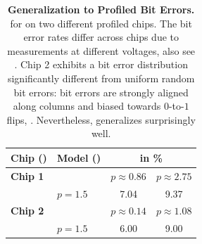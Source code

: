 \begin{table}[t]
	\centering
	\small
	\caption{\textbf{Generalization to Profiled Bit Errors.} \RTE for \Random on two different profiled chips. The bit error rates differ across chips due to measurements at different voltages, also see . Chip 2 exhibits a bit error distribution significantly different from uniform random bit errors: bit errors are strongly aligned along columns and biased towards $0$-to-$1$ flips, \cf {}. Nevertheless, \Random generalizes surprisingly well.}
	\label{tab:randbet-generalization}
	\vspace*{-0.25cm}
	\hspace*{-0.15cm}
	\begin{tabular}{| l | l | c | c |}
		\hline
		Chip (\figref{fig:errors}) & Model (\CifarT)& \multicolumn{2}{c|}{\RTE in \%}\\
		\hline
		\hline
		\bfseries Chip 1 && $p{\approx}0.86$ & {\color{colorbrewer1}$p{\approx}2.75$}\\
		\hline
		& \Random[$0.05$] $p{=}1.5$ & 7.04 & 9.37\\
		\hline
		\hline
		\bfseries Chip 2 && $p{\approx}0.14$ & {\color{colorbrewer1}$p{\approx}1.08$}\\
		\hline
		& \Random[$0.05$] $p{=}1.5$ & 6.00 & 9.00\\
		\hline
	\end{tabular}
	\vspace*{-0.2cm}
\end{table}
